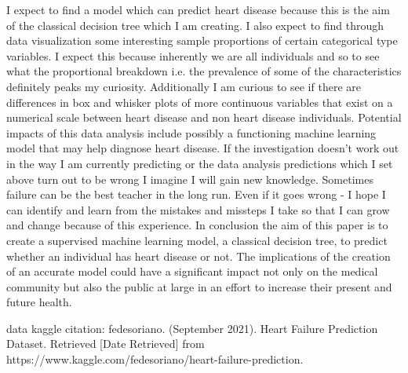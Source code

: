 \documentclass[12pt]{article}
\begin{document}
I expect to find a model which can predict heart disease because this is the aim of the classical decision tree which I am creating. I also expect to find through data visualization some interesting sample proportions of certain categorical type variables. I expect this because inherently we are all individuals and so to see what the proportional breakdown i.e. the prevalence of some of the characteristics definitely peaks my curiosity.  Additionally I am curious to see if there are differences in box and whisker plots of more continuous variables that exist on a numerical scale between heart disease and non heart disease individuals. Potential impacts of this data analysis include possibly a functioning machine learning model that may help diagnose heart disease. If the investigation doesn’t work out in the way I am currently predicting or the data analysis predictions which I set above turn out to be wrong I imagine I will gain new knowledge. Sometimes failure can be the best teacher in the long run. Even if it goes wrong - I hope I can identify and learn from the mistakes and missteps I take so that I can grow and change because of this experience.
In conclusion the aim of this paper is to create a supervised machine learning model, a classical decision tree, to predict whether an individual has heart disease or not. The implications of the creation of an accurate model could have a significant impact not only on the medical community but also the public at large in an effort to increase their present and future health. 
 
 
data kaggle citation:
fedesoriano. (September 2021). Heart Failure Prediction Dataset. Retrieved [Date Retrieved] from https://www.kaggle.com/fedesoriano/heart-failure-prediction.
\end{document}
